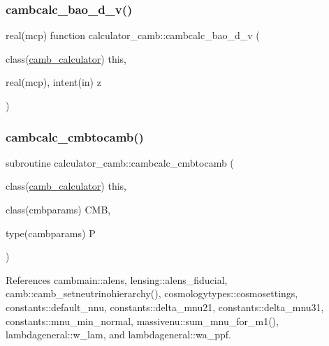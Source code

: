 \mbox{\label{namespacecalculator__camb_a18709a68a49a6989073dae760f643430}} 
\subsubsection{\texorpdfstring{cambcalc\+\_\+bao\+\_\+d\+\_\+v()}{cambcalc\_bao\_d\_v()}}
{\footnotesize\ttfamily real(mcp) function calculator\+\_\+camb\+::cambcalc\+\_\+bao\+\_\+d\+\_\+v (\begin{DoxyParamCaption}\item[{class(\mbox{\hyperlink{structcalculator__camb_1_1camb__calculator}{camb\+\_\+calculator}})}]{this,  }\item[{real(mcp), intent(in)}]{z }\end{DoxyParamCaption})}

\mbox{\label{namespacecalculator__camb_a10914a67c9b3a93d74382c9c9adf0983}} 
\subsubsection{\texorpdfstring{cambcalc\+\_\+cmbtocamb()}{cambcalc\_cmbtocamb()}}
{\footnotesize\ttfamily subroutine calculator\+\_\+camb\+::cambcalc\+\_\+cmbtocamb (\begin{DoxyParamCaption}\item[{class(\mbox{\hyperlink{structcalculator__camb_1_1camb__calculator}{camb\+\_\+calculator}})}]{this,  }\item[{class(cmbparams)}]{C\+MB,  }\item[{type(cambparams)}]{P }\end{DoxyParamCaption})\hspace{0.3cm}{\ttfamily [private]}}



References cambmain\+::alens, lensing\+::alens\+\_\+fiducial, camb\+::camb\+\_\+setneutrinohierarchy(), cosmologytypes\+::cosmosettings, constants\+::default\+\_\+nnu, constants\+::delta\+\_\+mnu21, constants\+::delta\+\_\+mnu31, constants\+::mnu\+\_\+min\+\_\+normal, massivenu\+::sum\+\_\+mnu\+\_\+for\+\_\+m1(), lambdageneral\+::w\+\_\+lam, and lambdageneral\+::wa\+\_\+ppf.

